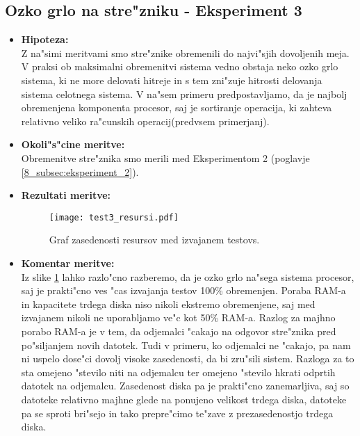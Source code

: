 \newpage
\subsection{Ozko grlo na stre"zniku - Eksperiment 3}
\begin{itemize}
	\item \textbf{Hipoteza: }  \\
		Z na"simi meritvami smo stre"znike obremenili do najvi"sjih dovoljenih meja. V praksi ob maksimalni obremenitvi sistema vedno obstaja neko ozko grlo sistema, ki ne more delovati hitreje in s tem zni"zuje hitrosti delovanja sistema celotnega sistema. V na"sem primeru predpostavljamo, da je najbolj obremenjena komponenta procesor, saj je sortiranje operacija, ki zahteva relativno veliko ra"cunskih operacij(predvsem primerjanj).

	\item \textbf{Okoli"s"cine meritve: } \\
		Obremenitve stre"znika smo merili med Eksperimentom 2 (poglavje \ref{8_subsec:eksperiment_2}).

 	\item \textbf{Rezultati meritve: }  \\
		\begin{figure}[!htb]
  		\centering
  		  \texttt{[image: test3\_resursi.pdf]}
  		\caption{Graf zasedenosti resursov med izvajanem testovs.}
  		\label{8_graf_zasedenost_resursov}
		\end{figure}


	\item \textbf{Komentar meritve: } \\
		Iz slike \ref{8_graf_zasedenost_resursov} lahko razlo"cno razberemo, da je ozko grlo na"sega sistema procesor, saj je prakti"cno ves "cas izvajanja testov 100\% obremenjen. Poraba RAM-a in kapacitete trdega diska niso nikoli ekstremo obremenjene, saj med izvajanem nikoli ne uporabljamo ve"c kot 50\% RAM-a. Razlog za majhno porabo RAM-a je v tem, da odjemalci "cakajo na odgovor stre"znika pred po"siljanjem novih datotek. Tudi v primeru, ko odjemalci ne "cakajo, pa nam ni uspelo dose"ci dovolj visoke zasedenosti, da bi zru"sili sistem. Razloga za to sta omejeno "stevilo niti na odjemalcu ter omejeno "stevilo hkrati odprtih datotek na odjemalcu. Zasedenost diska pa je prakti"cno zanemarljiva, saj so datoteke relativno majhne glede na ponujeno velikost trdega diska, datoteke pa se sproti bri"sejo in tako prepre"cimo te"zave z prezasedenostjo trdega diska.
\end{itemize}

